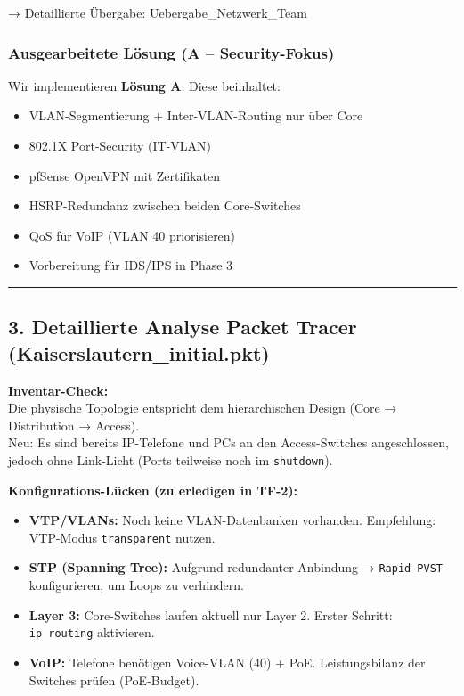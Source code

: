 \documentclass[
]{article}
\providecommand{\tightlist}{%
  \setlength{\itemsep}{0pt}\setlength{\parskip}{0pt}}
\begin{document}
→ Detaillierte Übergabe: Uebergabe\_Netzwerk\_Team

\subsubsection{Ausgearbeitete Lösung (A --
Security-Fokus)}\label{ausgearbeitete-luxf6sung-a-security-fokus}

Wir implementieren \textbf{Lösung A}. Diese beinhaltet:

\begin{itemize}
\tightlist
\item
  VLAN-Segmentierung + Inter-VLAN-Routing nur über Core
\item
  802.1X Port-Security (IT-VLAN)
\item
  pfSense OpenVPN mit Zertifikaten
\item
  HSRP-Redundanz zwischen beiden Core-Switches
\item
  QoS für VoIP (VLAN 40 priorisieren)
\item
  Vorbereitung für IDS/IPS in Phase 3
\end{itemize}

\begin{center}\rule{0.5\linewidth}{0.5pt}\end{center}

\subsection{3. Detaillierte Analyse Packet Tracer
(Kaiserslautern\_initial.pkt)}\label{detaillierte-analyse-packet-tracer-kaiserslautern_initial.pkt}

\textbf{Inventar-Check:}\\
Die physische Topologie entspricht dem hierarchischen Design (Core →
Distribution → Access).\\
Neu: Es sind bereits IP-Telefone und PCs an den Access-Switches
angeschlossen, jedoch ohne Link-Licht (Ports teilweise noch im
\texttt{shutdown}).

\textbf{Konfigurations-Lücken (zu erledigen in TF-2):}

\begin{itemize}
\tightlist
\item
  \textbf{VTP/VLANs:} Noch keine VLAN-Datenbanken vorhanden. Empfehlung:
  VTP-Modus \texttt{transparent} nutzen.
\item
  \textbf{STP (Spanning Tree):} Aufgrund redundanter Anbindung →
  \texttt{Rapid-PVST} konfigurieren, um Loops zu verhindern.
\item
  \textbf{Layer 3:} Core-Switches laufen aktuell nur Layer 2. Erster
  Schritt: \texttt{ip\ routing} aktivieren.
\item
  \textbf{VoIP:} Telefone benötigen Voice-VLAN (40) + PoE.
  Leistungsbilanz der Switches prüfen (PoE-Budget).
\end{itemize}
\end{document}
